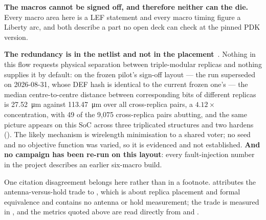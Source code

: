 \textbf{The macros cannot be signed off, and therefore neither can the
die.} Every macro area here is a LEF  statement and every
macro timing figure a Liberty arc, and both describe a part no open deck
can check at the pinned PDK version.

\textbf{The redundancy is in the netlist and not in the
placement}~\cite{companion_tmr}. Nothing in this flow requests physical
separation between triple-modular replicas and nothing supplies it by
default: on the
frozen pilot's sign-off layout --- the run  superseded on
2026-08-31, whose DEF hash is identical to the current frozen one's ---
the median centre-to-centre distance
between corresponding bits of different replicas is
\qty{27.52}{\um} against \qty{113.47}{\um} over all
cross-replica pairs, a $4.12\times$ concentration, with 49 of the 9,075
cross-replica pairs abutting, and the same picture appears on this SoC
across three
triplicated structures and two hardens
(). The likely mechanism is wirelength
minimisation to a shared voter; no seed and no objective function was
varied, so it is evidenced and not established. \textbf{And no campaign
has been re-run on this layout}: every fault-injection number in the
project describes an earlier six-macro build.

One citation disagreement belongs here rather than in a footnote.
 attributes the antenna-versus-hold trade to
, which is about replica placement and formal equivalence
and contains no antenna or hold measurement; the trade is measured in
, and the metrics quoted above are read directly
from  and .
